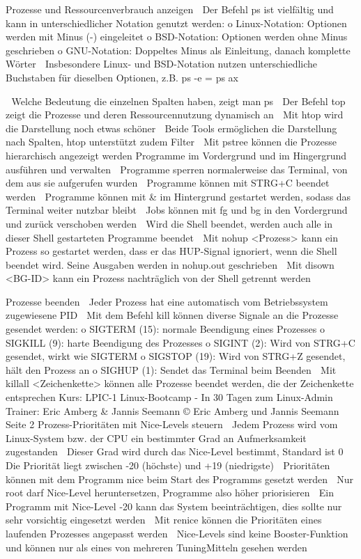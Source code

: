 Prozesse und Ressourcenverbrauch anzeigen
 Der Befehl ps ist vielfältig und kann in unterschiedlicher Notation genutzt werden:
o Linux-Notation: Optionen werden mit Minus (-) eingeleitet
o BSD-Notation: Optionen werden ohne Minus geschrieben
o GNU-Notation: Doppeltes Minus als Einleitung, danach komplette Wörter
 Insbesondere Linux- und BSD-Notation nutzen unterschiedliche Buchstaben für dieselben
Optionen, z.B. ps -e = ps ax

 Welche Bedeutung die einzelnen Spalten haben, zeigt man ps
 Der Befehl top zeigt die Prozesse und deren Ressourcennutzung dynamisch an
 Mit htop wird die Darstellung noch etwas schöner
 Beide Tools ermöglichen die Darstellung nach Spalten, htop unterstützt zudem Filter
 Mit pstree können die Prozesse hierarchisch angezeigt werden
Programme im Vordergrund und im Hingergrund ausführen und verwalten
 Programme sperren normalerweise das Terminal, von dem aus sie aufgerufen wurden
 Programme können mit STRG+C beendet werden
 Programme können mit & im Hintergrund gestartet werden, sodass das Terminal weiter
nutzbar bleibt
 Jobs können mit fg und bg in den Vordergrund und zurück verschoben werden
 Wird die Shell beendet, werden auch alle in dieser Shell gestarteten Programme beendet
 Mit nohup <Prozess> kann ein Prozess so gestartet werden, dass er das HUP-Signal ignoriert,
wenn die Shell beendet wird. Seine Ausgaben werden in nohup.out geschrieben
 Mit disown <BG-ID> kann ein Prozess nachträglich von der Shell getrennt werden


Prozesse beenden
 Jeder Prozess hat eine automatisch vom Betriebssystem zugewiesene PID
 Mit dem Befehl kill können diverse Signale an die Prozesse gesendet werden:
o SIGTERM (15): normale Beendigung eines Prozesses
o SIGKILL (9): harte Beendigung des Prozesses
o SIGINT (2): Wird von STRG+C gesendet, wirkt wie SIGTERM
o SIGSTOP (19): Wird von STRG+Z gesendet, hält den Prozess an
o SIGHUP (1): Sendet das Terminal beim Beenden
 Mit killall <Zeichenkette> können alle Prozesse beendet werden, die der Zeichenkette
entsprechen
Kurs: LPIC-1 Linux-Bootcamp - In 30 Tagen zum Linux-Admin
Trainer: Eric Amberg & Jannis Seemann
© Eric Amberg und Jannis Seemann Seite 2
Prozess-Prioritäten mit Nice-Levels steuern
 Jedem Prozess wird vom Linux-System bzw. der CPU ein bestimmter Grad an
Aufmerksamkeit zugestanden
 Dieser Grad wird durch das Nice-Level bestimmt, Standard ist 0
 Die Priorität liegt zwischen -20 (höchste) und +19 (niedrigste)
 Prioritäten können mit dem Programm nice beim Start des Programms gesetzt werden
 Nur root darf Nice-Level heruntersetzen, Programme also höher priorisieren
 Ein Programm mit Nice-Level -20 kann das System beeinträchtigen, dies sollte nur sehr
vorsichtig eingesetzt werden
 Mit renice können die Prioritäten eines laufenden Prozesses angepasst werden
 Nice-Levels sind keine Booster-Funktion und können nur als eines von mehreren TuningMitteln gesehen werden